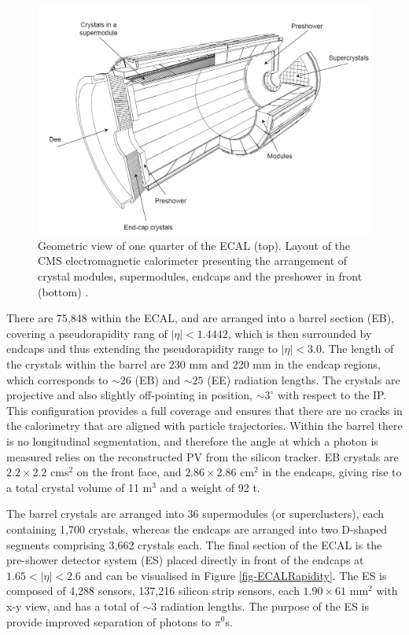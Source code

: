 \begin{figure} [h!] \label{fig-ECAL}
\includegraphics[width=\textwidth]{Figures/ECAL.png}
\caption{Geometric view of one quarter of the ECAL (top). Layout of the CMS electromagnetic calorimeter presenting the arrangement of crystal modules, supermodules, endcaps and the preshower in front (bottom) \cite{CMSexperiment}.}
\end{figure}

There are 75,848 within the ECAL, and are arranged into a barrel section (EB), covering a pseudorapidity rang of $|\eta|<1.4442$, which is then surrounded by endcaps and thus extending the pseudorapidity range to $|\eta|<3.0$. The length of the crystals within the barrel are 230 mm and 220 mm in the endcap regions, which corresponds to $\sim26$ (EB) and $\sim25$ (EE) radiation lengths. The crystals are projective and also slightly off-pointing in position, $\sim3^\circ$ with respect to the IP. This configuration provides a full coverage and ensures that there are no cracks in the calorimetry that are aligned with particle trajectories. Within the barrel there is no longitudinal segmentation, and therefore the angle at which a photon is measured relies on the reconstructed PV from the silicon tracker. EB crystals are $2.2\times2.2$ cms$^2$ on the front face, and $2.86\times2.86$ cm$^2$ in the endcaps, giving rise to a total crystal volume of 11 m$^3$ and a weight of 92 t.

The barrel crystals are arranged into 36 supermodules (or superclusters), each containing 1,700 crystals, whereas the endcaps are arranged into two D-shaped segments comprising 3,662 crystals each. The final section of the ECAL is the pre-shower detector system (ES) placed directly in front of the endcaps at $1.65<|\eta|<2.6$ and can be visualised in Figure \ref{fig-ECALRapidity}. The ES is composed of 4,288 sensors, 137,216 silicon strip sensors, each $1.90\times61$ mm$^2$ with x-y view, and has a total of $\sim3$ radiation lengths. The purpose of the ES is provide improved separation of photons to $\pi^0$s.

